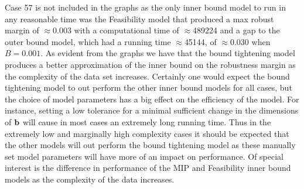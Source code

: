 Case 57 is not included in the graphs as the only inner bound model to run in any reasonable time was the Feasibility model that produced a max robust margin of $\approx$0.003 with a computational time of $\approx$489224 and a gap to the outer bound model, which had a running time $\approx$45144, of $\approx 0.030$ when $B=0.001$.
As evident from the graphs we have that the bound tightening model produces a better approximation of the inner bound on the robustness margin as the complexity of the data set increases. 
Certainly one would expect the bound tightening model to out perform the other inner bound models for all cases, but the choice of model parameters has a big effect on the efficiency of the model. 
For instance, setting a low tolerance for a minimal sufficient change in the dimensions of $\mathbf{b}$ will cause in most cases an extremely long running time. 
Thus in the extremely low and marginally high complexity cases it should be expected that the other models will out perform the bound tightening model as these manually set model parameters will have more of an impact on performance. 
Of special interest is the difference in performance of the MIP and Feasibility inner bound models as the complexity of the data increases. 






